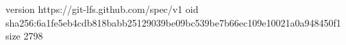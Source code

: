 version https://git-lfs.github.com/spec/v1
oid sha256:6a1fe5eb4cdb818babb25129039be09bc539be7b66ec109e10021a0a948450f1
size 2798
